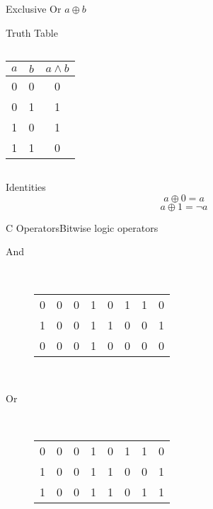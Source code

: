 \documentclass[svgnames,x11names]{beamer}
\begin{document}
\begin{frame}[fragile]{Exclusive Or $a \oplus b$}
  \begin{block}{Truth Table}
    \begin{columns}[onlytextwidth]
      \begin{column}{.3\textwidth}
        \begin{tabular}{cc|c}
          $a$ & $b$ & $a \wedge b$ \\\midrule
          0 & 0 & 0 \\
          0 & 1 & 1 \\
          1 & 0 & 1 \\
          1 & 1 & 0 \\
        \end{tabular}
      \end{column}
      \begin{column}{.5\textwidth}
      \end{column}
  \end{columns}
  \end{block}

  \begin{alertblock}{Identities}
    \[ a \oplus 0 = a \]
    \[ a \oplus 1 = \neg a \]
  \end{alertblock}
\end{frame}


\begin{frame}[fragile]{C Operators}{Bitwise logic operators}
  \begin{description}
  \item[And] ~  \linebreak 
    \begin{tabular}{cccccccc}
      0&0&0&1&0&1&1&0 \\
      1&0&0&1&1&0&0&1 \\\midrule
      0&0&0&1&0&0&0&0
    \end{tabular}\\[2em]

  \item[Or] ~  \linebreak
    \begin{tabular}{cccccccc}
      0&0&0&1&0&1&1&0 \\
      1&0&0&1&1&0&0&1 \\\midrule
      1&0&0&1&1&0&1&1
    \end{tabular}

  \end{description}
  
\end{frame}
\end{document}

